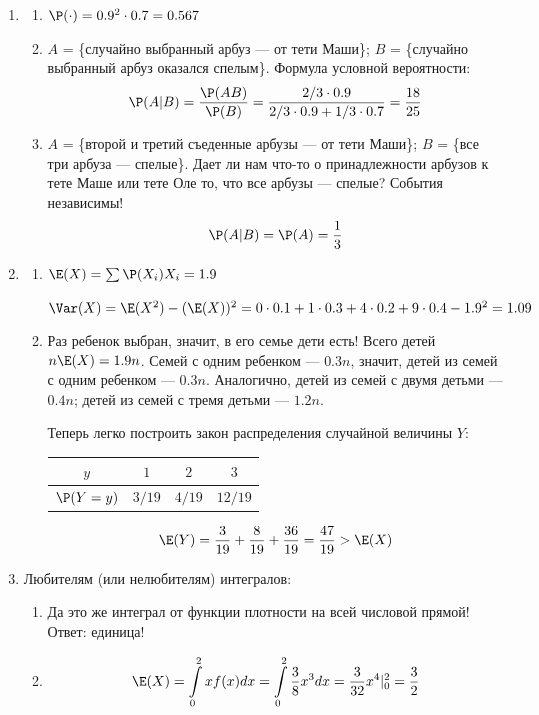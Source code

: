 \begin{enumerate}
\item

\begin{enumerate}
\item $\P(\cdot) = 0.9^2\cdot 0.7 = 0.567  $
\item $A$ = \{случайно выбранный арбуз — от тети Маши\}; $B$ = \{случайно выбранный арбуз оказался спелым\}. Формула условной вероятности:
\[\P(A|B) = \frac{\P(AB)}{\P(B)}= \frac{2/3 \cdot 0.9}{2/3 \cdot 0.9 + 1/3 \cdot 0.7} =\frac{18}{25}\]
\item $A$ = \{второй и третий съеденные арбузы — от тети Маши\}; $B$ = \{все три арбуза — спелые\}. Дает ли нам что-то о принадлежности арбузов к тете Маше или тете Оле то, что все арбузы — спелые? События независимы!
\[\P(A|B) = \P(A) = \frac{1}{3}\]
\end{enumerate}

\item
\begin{enumerate}
\item $\E(X) = \sum \P(X_i) X_i = 1.9$

$\Var(X) = \E(X^2) - (\E(X))^2 = 0\cdot 0.1 + 1 \cdot 0.3 + 4 \cdot 0.2 + 9 \cdot 0.4 - 1.9^2 = 1.09$

\item Раз ребенок выбран, значит, в его семье дети есть! Всего детей $n\E(X) = 1.9n$. Семей с одним ребенком — $0.3n$, значит, детей из семей с одним ребенком — $0.3n$. Аналогично, детей из семей с двумя детьми — $0.4n$; детей из семей с тремя детьми — $1.2n$.

Теперь легко построить закон распределения случайной величины $Y$:

\begin{tabular}{cccc}
\toprule
$y$ & $1$ & $2$ & $3$  \\ \midrule
$\P(Y=y)$ & $3/19$ & $4/19$ & $12/19$  \\ \bottomrule
\end{tabular}


\[\E(Y) = \frac{3}{19} + \frac{8}{19} + \frac{36}{19} = \frac{47}{19} > \E(X)\]

\end{enumerate}


\item
Любителям (или нелюбителям) интегралов:
\begin{enumerate}
\item Да это же интеграл от функции плотности на всей числовой прямой! Ответ: единица!
\item \[\E(X) = \int \limits_0^2 x f(x) dx = \int \limits_0^2 \frac{3}{8} x^3 dx = \frac{3}{32} x^4 |_0^2 = \frac{3}{2}\]


\end{enumerate}
\end{enumerate}
